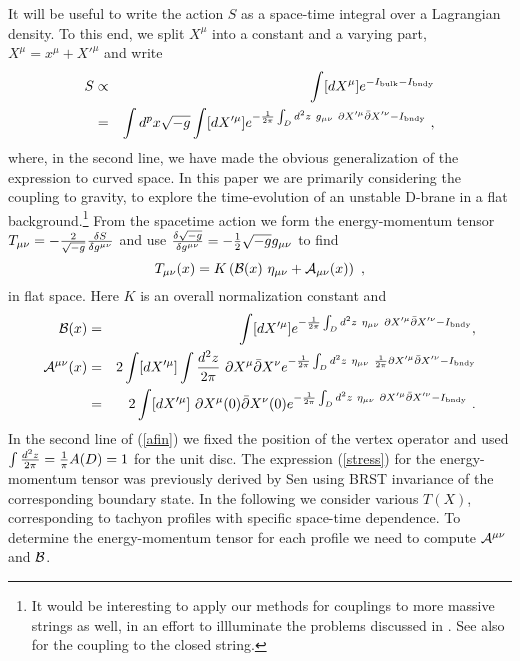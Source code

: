 \documentclass[a4paper,12pt]{article}
\def\p{\partial}
\def\pb{\bar{\partial}}
\begin{document}
It will be useful to write the action $S$ as a space-time integral over a Lagrangian density. 
To this end, we split $X^{\mu}$ into a constant and a varying part, $X^\mu = x^\mu + X'^\mu$ 
and write
\begin{eqnarray}
S&\propto&\int [dX^\mu] e^{-I_{\rm bulk}-I_{\rm bndy}} \nonumber
\\&=&\int d^{p} x \sqrt{-g} \int [dX'^\mu] e^{-{1\over 2 \pi} \int_D d^2 z ~ g_{\mu \nu}~ \p X'^\mu  \pb X'^\nu - I_{\rm bndy} }~,
\end{eqnarray}
where, in the second line, we have made the obvious generalization of the expression to curved space. In this paper we are primarily considering the coupling to gravity, to explore the 
time-evolution of an unstable D-brane in a flat background.\footnote{It would be interesting 
to apply our methods for couplings to more massive strings as well, in an effort to illluminate 
the problems discussed in \cite{Okuda:2002yd}. 
See also \cite{Chen et al} for the coupling to the closed string.}  From the spacetime action we form
the energy-momentum tensor $
T_{\mu \nu}=-{2 \over \sqrt{-g}} {\delta S \over \delta g^{\mu \nu}}$ and use  ${\delta \sqrt{-g} \over \delta{g^{\mu \nu}}}=-{1 \over 2}\sqrt{-g}g_{\mu \nu}$ to find 
\begin{equation}
T_{\mu \nu}(x)=K\left( {\cal B}(x)~\eta_{\mu \nu}+{\cal A}_{\mu \nu}(x)\right)~,
\label{stress}
\end{equation}
in flat space. Here $K$ is an overall normalization constant and
\begin{eqnarray}
{\cal B}(x)& = & \int [dX'^\mu] e^{-{1\over 2 \pi } \int_D d^2 z ~ \eta_{\mu \nu}~ \p X'^\mu  \pb X'^\nu - 
I_{\rm bndy}}, \\
{\cal A}^{\mu \nu}(x)& =  & 2 \int [dX'^\mu] \int {d^2 z\over 2 \pi}  ~ \p X^\mu \pb X^\nu  e^{-{1\over 2 \pi } \int_D d^2 z ~ \eta_{\mu \nu}~ {1 \over 2\pi} \p X'^\mu  \pb X'^\nu - I_{\rm bndy}} \nonumber \\
& = & 2 \int [dX'^\mu] ~  \p X^\mu(0) \pb X^\nu(0)  e^{-{1\over 2 \pi } \int_D d^2 z ~ \eta_{\mu \nu}~ \p X'^\mu  \pb X'^\nu - I_{\rm bndy}}~.
\label{afin}
\end{eqnarray}
In the second line of (\ref{afin}) we fixed the position of the vertex operator and 
used $\int {d^2 z\over 2\pi}={1\over\pi}A(D)=1$ for the unit disc.
The expression (\ref{stress}) for the energy-momentum tensor was previously derived
by Sen \cite{Sen1} using  BRST invariance of the corresponding boundary state.  
In the following we consider various $T(X)$, corresponding to tachyon profiles with 
specific space-time dependence. To determine the energy-momentum tensor for each 
profile we need to compute ${\cal A}^{\mu \nu}$ and ${\cal B}$.
\end{document}
